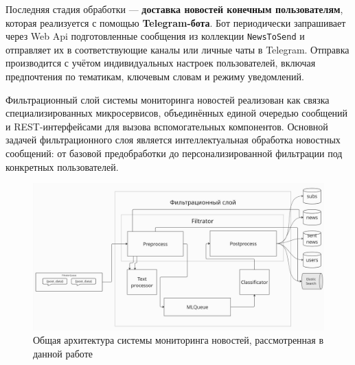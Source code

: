Последняя стадия обработки — \textbf{доставка новостей конечным пользователям}, которая реализуется с помощью \textbf{Telegram-бота}.
Бот периодически запрашивает через Web Api подготовленные сообщения из коллекции \texttt{NewsToSend} и отправляет их в соответствующие каналы или личные чаты в Telegram.
Отправка производится с учётом индивидуальных настроек пользователей, включая предпочтения по тематикам, ключевым словам и режиму уведомлений.

\label{subsec:filtersloy}
Фильтрационный слой системы мониторинга новостей реализован как связка специализированных микросервисов, объединённых единой очередью сообщений и REST-интерфейсами для вызова вспомогательных компонентов.
Основной задачей фильтрационного слоя является интеллектуальная обработка новостных сообщений: от базовой предобработки до персонализированной фильтрации под конкретных пользователей.

\begin{figure}[H]
    \centering
    \includegraphics[width=150mm]{images/filter_process}
    \caption{Общая архитектура системы мониторинга новостей, рассмотренная в данной работе}
    \label{fig:filter_process}
\end{figure}

